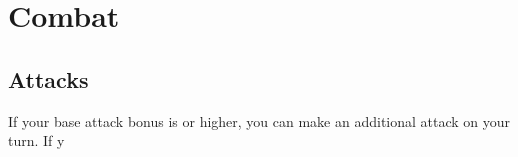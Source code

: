 \chapter{Combat}\label{Combat}

\section{Attacks}
If your base attack bonus is  or higher, you can make an additional attack on your turn. If y
